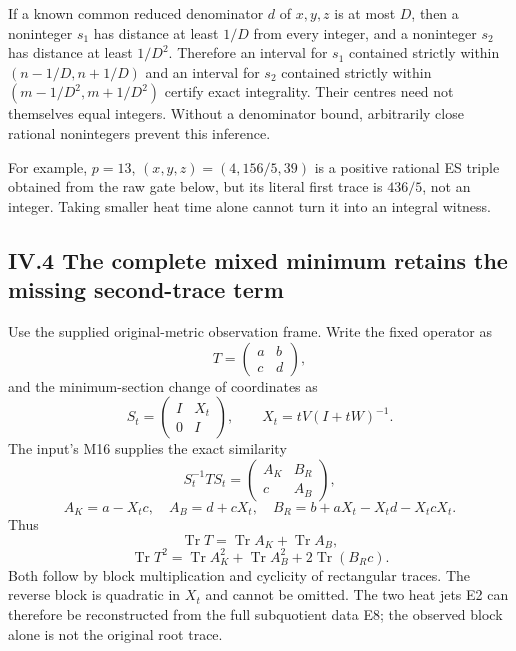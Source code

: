 \documentclass[11pt]{article}
\begin{document}
If a known common reduced denominator \(d\) of \(x,y,z\) is at most \(D\), then a noninteger \(s_1\) has distance at least \(1/D\) from every integer, and a noninteger \(s_2\) has distance at least \(1/D^2\). Therefore an interval for \(s_1\) contained strictly within \((n-1/D,n+1/D)\) and an interval for \(s_2\) contained strictly within \((m-1/D^2,m+1/D^2)\) certify exact integrality. Their centres need not themselves equal integers. Without a denominator bound, arbitrarily close rational nonintegers prevent this inference.

For example, \(p=13\), \((x,y,z)=(4,156/5,39)\) is a positive rational ES triple obtained from the raw gate below, but its literal first trace is \(436/5\), not an integer. Taking smaller heat time alone cannot turn it into an integral witness.

\subsection{IV.4 The complete mixed minimum retains the missing second-trace term}\label{iv.4-the-complete-mixed-minimum-retains-the-missing-second-trace-term}

Use the supplied original-metric observation frame. Write the fixed operator as \[
 T=\begin{pmatrix}a&b\\c&d\end{pmatrix},
\] and the minimum-section change of coordinates as \[
 S_t=\begin{pmatrix}I&X_t\\0&I\end{pmatrix},\qquad
 X_t=tV(I+tW)^{-1}.
\] The input's M16 supplies the exact similarity \[
 S_t^{-1}TS_t=
 \begin{pmatrix}
 A_K&B_R\\c&A_B
 \end{pmatrix},
\] \[
 A_K=a-X_tc,\quad A_B=d+cX_t,
 \quad B_R=b+aX_t-X_td-X_tcX_t.
 \tag{E7}
\] Thus \[
 \boxed{\operatorname{Tr}T=\operatorname{Tr}A_K+\operatorname{Tr}A_B,}
\] \[
 \boxed{\operatorname{Tr}T^2
 =\operatorname{Tr}A_K^2+\operatorname{Tr}A_B^2
       +2\operatorname{Tr}(B_Rc).}
 \tag{E8}
\] Both follow by block multiplication and cyclicity of rectangular traces. The reverse block is quadratic in \(X_t\) and cannot be omitted. The two heat jets E2 can therefore be reconstructed from the full subquotient data E8; the observed block alone is not the original root trace.
\end{document}
